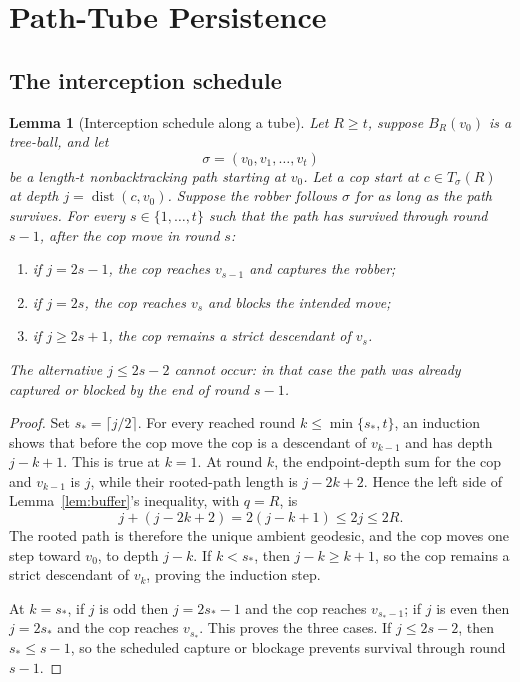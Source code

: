 \documentclass[11pt]{amsart}
\newtheorem{lemma}[theorem]{Lemma}
\theoremstyle{definition}
\DeclareMathOperator{\dist}{dist}
\begin{document}
\section{Path-Tube Persistence}

\subsection{The interception schedule}

\begin{lemma}[Interception schedule along a tube]
\label{lem:interception}
Let $R\geq t$, suppose $B_R(v_0)$ is a tree-ball, and let
\[
\sigma=(v_0,v_1,\ldots,v_t)
\]
be a length-$t$ nonbacktracking path starting at $v_0$. Let a cop start at $c\in T_\sigma(R)$ at depth $j=\dist(c,v_0)$. Suppose the robber follows $\sigma$ for as long as the path survives. For every $s\in\{1,\ldots,t\}$ such that the path has survived through round $s-1$, after the cop move in round $s$:
\begin{enumerate}[label=(\roman*)]
\item if $j=2s-1$, the cop reaches $v_{s-1}$ and captures the robber;
\item if $j=2s$, the cop reaches $v_s$ and blocks the intended move;
\item if $j\geq2s+1$, the cop remains a strict descendant of $v_s$.
\end{enumerate}
The alternative $j\leq2s-2$ cannot occur: in that case the path was already captured or blocked by the end of round $s-1$.
\end{lemma}

\begin{proof}
Set $s_*=\lceil j/2\rceil$. For every reached round $k\leq\min\{s_*,t\}$, an induction shows that before the cop move the cop is a descendant of $v_{k-1}$ and has depth $j-k+1$. This is true at $k=1$. At round $k$, the endpoint-depth sum for the cop and $v_{k-1}$ is $j$, while their rooted-path length is $j-2k+2$. Hence the left side of Lemma~\ref{lem:buffer}'s inequality, with $q=R$, is
\[
j+(j-2k+2)=2(j-k+1)\leq2j\leq2R.
\]
The rooted path is therefore the unique ambient geodesic, and the cop moves one step toward $v_0$, to depth $j-k$. If $k<s_*$, then $j-k\geq k+1$, so the cop remains a strict descendant of $v_k$, proving the induction step.

At $k=s_*$, if $j$ is odd then $j=2s_*-1$ and the cop reaches $v_{s_*-1}$; if $j$ is even then $j=2s_*$ and the cop reaches $v_{s_*}$. This proves the three cases. If $j\leq2s-2$, then $s_*\leq s-1$, so the scheduled capture or blockage prevents survival through round $s-1$.
\end{proof}
\end{document}
